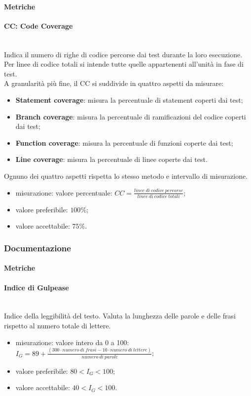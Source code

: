 		\paragraph{Metriche}
			\paragraph*{CC: Code Coverage}\mbox{}\\
				Indica il numero di righe di codice percorse dai test durante la loro esecuzione. Per linee di codice totali si intende tutte quelle appartenenti all'unità in fase di test.\\
				A granularità più fine, il CC si suddivide in quattro aspetti da misurare:
				\begin{itemize}
					\item \textbf{Statement coverage}: misura la percentuale di statement coperti dai test;
					\item \textbf{Branch coverage}: misura la percentuale di ramificazioni del codice coperti dai test;
					\item \textbf{Function coverage}: misura la percentuale di funzioni coperte dai test;
					\item \textbf{Line coverage}: misura la percentuale di linee coperte dai test.
				\end{itemize}
				Ognuno dei quattro aspetti rispetta lo stesso metodo e intervallo di misurazione.
				\begin{itemize}
					\item misurazione: valore percentuale: $CC = \frac{linee\ di\ codice\ percorse}{linee\ di\ codice\ totali}$;
					\item valore preferibile: $100\%$;
					\item valore accettabile: $75\%$.
				\end{itemize}
	\subsubsection{Documentazione}
		\paragraph{Metriche}
			\paragraph*{Indice di Gulpease}\mbox{}\\
			Indice della leggibilità del testo. Valuta la lunghezza delle parole e delle frasi rispetto al numero totale di lettere. 
			\begin{itemize}
				\item misurazione: valore intero da 0 a 100:\newline 	
				$I_G = 89+ \frac{(300 \cdot numero\ di\ frasi - 10 \cdot numero\ di\ lettere)}{numero\ di\ parole}$;	
				\item valore preferibile: $80 < I_G < 100$;
				\item valore accettabile: $40 < I_G < 100$.
			\end{itemize}

